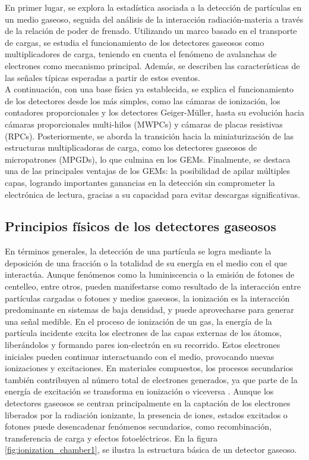 \documentclass{report}
\begin{document}
\noindent En primer lugar, se explora la estadística asociada a la detección de partículas en un medio gaseoso, seguida del análisis de la interacción radiación-materia a través de la relación de poder de frenado. Utilizando un marco basado en el transporte de cargas, se estudia el funcionamiento de los detectores gaseosos como multiplicadores de carga, teniendo en cuenta el fenómeno de avalanchas de electrones como mecanismo principal. Además, se describen las características de las señales típicas esperadas a partir de estos eventos.\\

\noindent A continuación, con una base física ya establecida, se explica el funcionamiento de los detectores desde los más simples, como las cámaras de ionización, los contadores proporcionales y los detectores Geiger-Müller, hasta su evolución hacia cámaras proporcionales multi-hilos (MWPCs) y cámaras de placas resistivas (RPCs). Posteriormente, se aborda la transición hacia la miniaturización de las estructuras multiplicadoras de carga, como los detectores gaseosos de micropatrones (MPGDs), lo que culmina en los GEMs. Finalmente, se destaca una de las principales ventajas de los GEMs: la posibilidad de apilar múltiples capas, logrando importantes ganancias en la detección sin comprometer la electrónica de lectura, gracias a su capacidad para evitar descargas significativas.

\subsection{Principios físicos de los detectores gaseosos}

\noindent En términos generales, la detección de una partícula se logra mediante la deposición de una fracción o la totalidad de su energía en el medio con el que interactúa. Aunque fenómenos como la luminiscencia o la emisión de fotones de centelleo, entre otros, pueden manifestarse como resultado de la interacción entre partículas cargadas o fotones y medios gaseosos, la ionización es la interacción predominante en sistemas de baja densidad, y puede aprovecharse para generar una señal medible. En el proceso de ionización de un gas, la energía de la partícula incidente excita los electrones de las capas externas de los átomos, liberándolos y formando pares ion-electrón en su recorrido. Estos electrones iniciales pueden continuar interactuando con el medio, provocando nuevas ionizaciones y excitaciones. En materiales compuestos, los procesos secundarios también contribuyen al número total de electrones generados, ya que parte de la energía de excitación se transforma en ionización o viceversa \cite{kolanoski2020particle1}. Aunque los detectores gaseosos se centran principalmente en la captación de los electrones liberados por la radiación ionizante, la presencia de iones, estados excitados o fotones puede desencadenar fenómenos secundarios, como recombinación, transferencia de carga y efectos fotoeléctricos. En la figura \ref{fig:ionization_chamber1}, se ilustra la estructura básica de un detector gaseoso.
\end{document}

